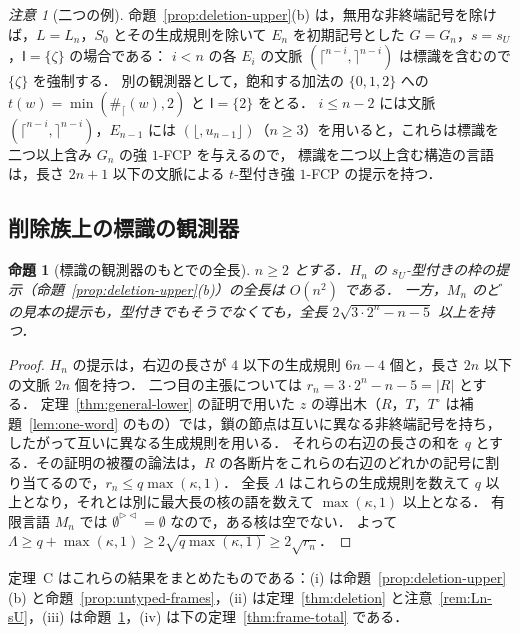 \documentclass[11pt,a4paper]{ltjsarticle}
\numberwithin{equation}{section}
\theoremstyle{plain}
\newtheorem{proposition}[theorem]{命題}
\theoremstyle{definition}
\theoremstyle{remark}
\newtheorem{remark}[theorem]{注意}
\theoremstyle{plain}
\newcommand{\RL}{^{\rhd\lhd}}
\newcommand{\Lfl}{\lfloor}
\newcommand{\Rfl}{\rfloor}
\newcommand{\Lce}{\lceil}
\newcommand{\Rce}{\rceil}
\begin{document}
\begin{remark}[二つの例]\label{rem:ideal-examples}
命題~\ref{prop:deletion-upper}(b) は，無用な非終端記号を除けば，$L=L_n$，$S_0$ とその生成規則を除いて $E_n$ を初期記号とした $G=G_n$，$s=s_U$，$\mathsf I=\{\zeta\}$ の場合である：
$i<n$ の各 $E_i$ の文脈 $(\Lce^{n-i},\Rce^{n-i})$ は標識を含むので $\{\zeta\}$ を強制する．
別の観測器として，飽和する加法の $\{0,1,2\}$ への $t(w)=\min(\#_{\Lce}(w),2)$ と $\mathsf I=\{2\}$ をとる．
$i\le n-2$ には文脈 $(\Lce^{n-i},\Rce^{n-i})$，$E_{n-1}$ には $(\Lfl,u_{n-1}\Rfl)$（$n\ge3$）を用いると，これらは標識を二つ以上含み $G_n$ の強 $1$-FCP を与えるので，
標識を二つ以上含む構造の言語は，長さ $2n+1$ 以下の文脈による $t$-型付き強 $1$-FCP の提示を持つ．
\end{remark}

\subsection*{削除族上の標識の観測器}

\begin{proposition}[標識の観測器のもとでの全長]\label{prop:mark-total}
$n\ge2$ とする．$H_n$ の $s_U$-型付きの枠の提示（命題~\ref{prop:deletion-upper}(b)）の全長は $O(n^2)$ である．
一方，$M_n$ のどの見本の提示も，型付きでもそうでなくても，全長 $2\sqrt{3\cdot2^n-n-5}$ 以上を持つ．
\end{proposition}
\begin{proof}
$H_n$ の提示は，右辺の長さが $4$ 以下の生成規則 $6n-4$ 個と，長さ $2n$ 以下の文脈 $2n$ 個を持つ．
二つ目の主張については $r_n=3\cdot2^n-n-5=|R|$ とする．
定理~\ref{thm:general-lower} の証明で用いた $z$ の導出木（$R$，$T$，$T^\circ$ は補題~\ref{lem:one-word} のもの）では，鎖の節点は互いに異なる非終端記号を持ち，したがって互いに異なる生成規則を用いる．
それらの右辺の長さの和を $q$ とする．その証明の被覆の論法は，$R$ の各断片をこれらの右辺のどれかの記号に割り当てるので，$r_n\le q\max(\kappa,1)$．
全長 $\Lambda$ はこれらの生成規則を数えて $q$ 以上となり，それとは別に最大長の核の語を数えて $\max(\kappa,1)$ 以上となる．
有限言語 $M_n$ では $\emptyset\RL=\emptyset$ なので，ある核は空でない．
よって $\Lambda\ge q+\max(\kappa,1)\ge2\sqrt{q\max(\kappa,1)}\ge2\sqrt{r_n}$．
\end{proof}

定理~C はこれらの結果をまとめたものである：(i) は命題~\ref{prop:deletion-upper}(b) と命題~\ref{prop:untyped-frames}，(ii) は定理~\ref{thm:deletion} と注意~\ref{rem:Ln-sU}，(iii) は命題~\ref{prop:mark-total}，(iv) は下の定理~\ref{thm:frame-total} である．
\end{document}
